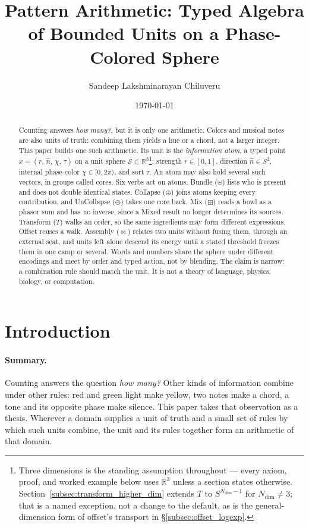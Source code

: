 \documentclass[12pt, a4paper]{article}
\title{Pattern Arithmetic: Typed Algebra of Bounded Units on a Phase-Colored Sphere}
\author{Sandeep Lakshminarayan Chiluveru}
\date{\today}
\begin{document}
\maketitle

\begin{abstract}
Counting answers \emph{how many?}, but it is only one arithmetic. Colors and musical notes are also units of truth: combining them yields a hue or a chord, not a larger integer. This paper builds one such arithmetic. Its unit is the \emph{information atom}, a typed point
$x = (r,\,\hat n,\,\chi,\,\tau)$
on a unit sphere $\mathcal{S} \subset \mathbb{R}^3$\footnote{Three
dimensions is the standing assumption throughout --- every axiom,
proof, and worked example below uses $\mathbb{R}^3$ unless a section
states otherwise. Section~\ref{subsec:transform_higher_dim} extends
$T$ to $S^{N_{\mathrm{dim}}-1}$ for $N_{\mathrm{dim}}\ne3$; that is a
named exception, not a change to the default, as is the
general-dimension form of offset's transport in
\S\ref{subsec:offset_logexp}.}: strength $r \in [0, 1]$, direction $\hat n \in S^2$, internal phase-color $\chi \in [0, 2\pi)$, and sort $\tau$. An atom may also hold several such vectors, in groups called cores. Six verbs act on atoms. Bundle ($\uplus$) lists who is present and does not double identical states. Collapse ($\oplus$) joins atoms keeping every contribution, and UnCollapse ($\ominus$) takes one core back. Mix ($\boxplus$) reads a bowl as a phasor sum and has no inverse, since a Mixed result no longer determines its sources. Transform ($T$) walks an order, so the same ingredients may form different expressions. Offset reuses a walk. Assembly ($\bowtie$) relates two units without fusing them, through an external seat, and units left alone descend its energy until a stated threshold freezes them in one camp or several. Words and numbers share the sphere under different encodings and meet by order and typed action, not by blending. The claim is narrow: a combination rule should match the unit. It is not a theory of language, physics, biology, or computation.
\end{abstract}

\section{Introduction}

\paragraph{Summary.}
Counting answers the question \emph{how many?} Other kinds of information combine under other rules: red and green light make yellow, two notes make a chord, a tone and its opposite phase make silence. This paper takes that observation as a thesis. Wherever a domain supplies a unit of truth and a small set of rules by which such units combine, the unit and its rules together form an arithmetic of that domain.
\end{document}
